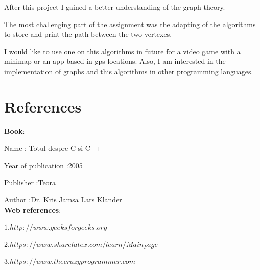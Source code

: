 \documentclass[12]{article}
\begin{document}
After this project I gained a better understanding of the graph theory.

The most challenging part of the assignment was the adapting of the algorithms to store and print the path between the two vertexes. 

I would like to use one on this algorithms in future for a video game with a minimap or an app based in gps locations. Also, I am interested in the implementation of graphs and this algorithms in other programming languages.

\newpage
\section{References}

\textbf{Book}:

Name : Totul despre C si C++ 

Year of publication  :2005

Publisher :Teora

Author :Dr. Kris Jamsa Lars Klander\\
\textbf{Web references}:

$1.http://www.geeksforgeeks.org$

$2. https://www.sharelatex.com/learn/Main_Page$

$3. https://www.thecrazyprogrammer.com$
\end{document}
